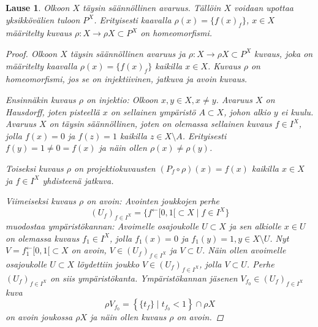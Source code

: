 \documentclass[12pt,a4paper,leqno]{report}
\theoremstyle{plain}
\newtheorem{lause}[equation]{Lause}
\theoremstyle{definition}
\theoremstyle{remark}
\begin{document}
\begin{lause}\label{comp_reg_upotus}
Olkoon $X$ täysin säännöllinen avaruus. 
Tällöin $X$ voidaan upottaa yksikkövälien tuloon $P^X$. 
Erityisesti kaavalla $\rho(x)=\{f(x)_f\}$, $x\in X $ määritelty 
kuvaus $\rho\colon X\rightarrow \rho X\subset P^X$ on homeomorfismi. 
\begin{proof}
Olkoon $X$ täysin säännöllinen avaruus ja 
$\rho\colon X\rightarrow 
\rho X\subset 
P^X$ kuvaus, 
joka on määritelty kaavalla $\rho(x)=\{f(x)_f\}$ kaikilla $x\in X $. 
Kuvaus $\rho$ on homeomorfismi, jos se on injektiivinen, jatkuva ja avoin kuvaus. 

Ensinnäkin kuvaus $\rho$ on injektio: 
Olkoon $x,y\in X, x\neq y$. 
Avaruus $X$ on Hausdorff, 
joten pisteellä $x$ on sellainen ympäristö $A\subset X$, 
johon alkio $y$ ei kuulu. 
Avaruus $X$ on täysin säännöllinen, 
joten on olemassa sellainen kuvaus $f\in I^X$, 
jolla $f(x)=0$ ja $f(z)=1$ kaikilla $z\in X\setminus A$. 
Erityisesti $f(y)=1\neq 0=f(x)$ ja näin ollen $\rho(x)\neq \rho(y)$. 

Toiseksi kuvaus $\rho$ on projektiokuvausten 
$(P_f\circ\rho)(x)
=f(x)$ kaikilla $x\in X$ ja $f\in I^X$ yhdisteenä jatkuva.

Viimeiseksi kuvaus $\rho$ on avoin: 
Avointen joukkojen perhe 
$$(U_f)_{f\in I^X}=\{f^\leftarrow [0,1[\subset X\mid f\in I^X\}$$
muodostaa ympäristökannan: 
Avoimelle osajoukolle $U\subset X$ ja sen alkiolle $x\in U$ 
on olemassa kuvaus $f_1\in I^X$, 
jolla $f_1(x)=0$ ja $f_1(y)=1,y\in X\setminus U$. 
Nyt $V=f_1^\leftarrow [0,1[\subset X$ on avoin,
$V\in (U_f)_{f\in I^X}$ ja $V\subset U$. 
Näin ollen avoimelle osajoukolle $U\subset X$ löydettiin joukko
$V\in (U_f)_{f\in I^X}$, jolla $V\subset U$. 
Perhe $(U_f)_{f\in I^X}$ on siis ympäristökanta. 
Ympäristökannan jäsenen $V_{f_0}\in (U_f)_{f\in I^X}$ kuva 
$$\rho V_{f_0}=\left\{\{t_f\}\mid t_{f_0}<1\right\}\cap \rho X$$
on avoin joukossa $\rho X$ ja näin ollen kuvaus $\rho$ on avoin.
\end{proof}
\end{lause}
\end{document}

